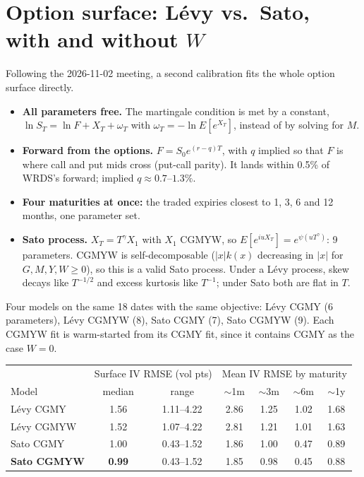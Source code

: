 \documentclass[11pt]{article}
\begin{document}
\section{Option surface: Lévy vs.\ Sato, with and without $W$}
Following the 2026-11-02 meeting, a second calibration fits the whole option surface directly.
\begin{itemize}
\item \textbf{All parameters free.} The martingale condition is met by a constant,
$\ln S_T=\ln F+X_T+\omega_T$ with $\omega_T=-\ln E[e^{X_T}]$, instead of by solving for $M$.
\item \textbf{Forward from the options.} $F=S_0e^{(r-q)T}$, with $q$ implied so that $F$ is where call and put
mids cross (put-call parity). It lands within 0.5\% of WRDS's forward; implied $q\approx0.7$--$1.3\%$.
\item \textbf{Four maturities at once:} the traded expiries closest to 1, 3, 6 and 12 months, one parameter set.
\item \textbf{Sato process.} $X_T=T^\gamma X_1$ with $X_1$ CGMYW, so $E[e^{iuX_T}]=e^{\psi(uT^\gamma)}$: 9 parameters.
CGMYW is self-decomposable ($|x|k(x)$ decreasing in $|x|$ for $G,M,Y,W\ge0$), so this is a valid Sato process.
Under a Lévy process, skew decays like $T^{-1/2}$ and excess kurtosis like $T^{-1}$; under Sato both are flat in $T$.
\end{itemize}
Four models on the same 18 dates with the same objective: Lévy CGMY (6 parameters), Lévy CGMYW (8),
Sato CGMY (7), Sato CGMYW (9). Each CGMYW fit is warm-started from its CGMY fit, since it contains CGMY as the case $W=0$.
\begin{table}[H]\centering\small
\begin{tabular}{lcccccc}\toprule
& \multicolumn{2}{c}{Surface IV RMSE (vol pts)} & \multicolumn{4}{c}{Mean IV RMSE by maturity}\\
Model & median & range & $\sim$1m & $\sim$3m & $\sim$6m & $\sim$1y\\\midrule
Lévy CGMY  & 1.56 & 1.11--4.22 & 2.86 & 1.25 & 1.02 & 1.68\\
Lévy CGMYW & 1.52 & 1.07--4.22 & 2.81 & 1.21 & 1.01 & 1.63\\
Sato CGMY  & 1.00 & 0.43--1.52 & 1.86 & 1.00 & 0.47 & 0.89\\
\textbf{Sato CGMYW} & \textbf{0.99} & 0.43--1.52 & 1.85 & 0.98 & 0.45 & 0.88\\\bottomrule
\end{tabular}\end{table}
\end{document}
